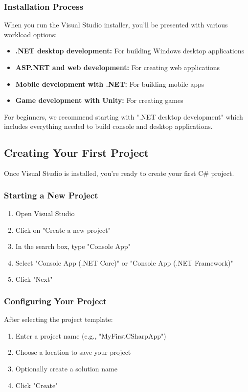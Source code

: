 \documentclass{article}
\begin{document}
\subsubsection{Installation Process}
When you run the Visual Studio installer, you'll be presented with various workload options:

\begin{itemize}
    \item \textbf{.NET desktop development:} For building Windows desktop applications
    \item \textbf{ASP.NET and web development:} For creating web applications
    \item \textbf{Mobile development with .NET:} For building mobile apps
    \item \textbf{Game development with Unity:} For creating games
\end{itemize}

For beginners, we recommend starting with ".NET desktop development" which includes everything needed to build console and desktop applications.

\subsection{Creating Your First Project}
Once Visual Studio is installed, you're ready to create your first C\# project.

\subsubsection{Starting a New Project}
\begin{enumerate}
    \item Open Visual Studio
    \item Click on "Create a new project"
    \item In the search box, type "Console App"
    \item Select "Console App (.NET Core)" or "Console App (.NET Framework)"
    \item Click "Next"
\end{enumerate}

\subsubsection{Configuring Your Project}
After selecting the project template:
\begin{enumerate}
    \item Enter a project name (e.g., "MyFirstCSharpApp")
    \item Choose a location to save your project
    \item Optionally create a solution name
    \item Click "Create"
\end{enumerate}
\end{document}
